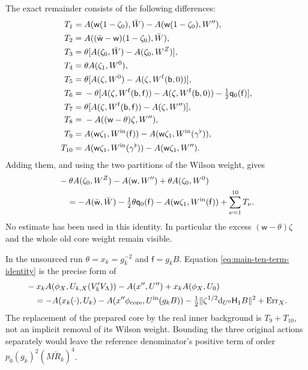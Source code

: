 \documentclass[11pt,letterpaper,reqno]{amsart}
\theoremstyle{definition}
\theoremstyle{remark}
\begin{document}
The exact remainder consists of the following differences:
\begin{align*}
 T_1={}&A(\mathsf w(1-\zeta_0),\bar W)
                       -A(\mathsf w(1-\zeta_0),W''),\\
 T_2={}&A((\bar{\mathsf w}-\mathsf w)(1-\zeta_0),\bar W),\\
 T_3={}&\theta[A(\zeta_0,\bar W)-A(\zeta_0,W^Z)],\\
 T_4={}&\theta A(\zeta_1,W^0),\\
 T_5={}&\theta[A(\zeta,W^0)-A(\zeta,W^{\rm f}(\mathsf b,0))],\\
 T_6={}&-\theta[A(\zeta,W^{\rm f}(\mathsf b,\mathsf f))
        -A(\zeta,W^{\rm f}(\mathsf b,0))
                              -\tfrac12\mathsf q_0(\mathsf f)],\\
 T_7={}&\theta[A(\zeta,W^{\rm f}(\mathsf b,\mathsf f))
                                      -A(\zeta,W'')],\\
 T_8={}&-A((\mathsf w-\theta)\zeta,W''),\\
 T_9={}&A(\mathsf w\zeta_1,W^{\rm in}(\mathsf f))
                      -A(\mathsf w\zeta_1,W^{\rm in}(\gamma^\flat)),\\
 T_{10}={}&A(\mathsf w\zeta_1,W^{\rm in}(\gamma^\flat))
                                      -A(\mathsf w\zeta_1,W'').
\end{align*}
Adding them, and using the two partitions of the Wilson
weight, gives
\begin{equation}\label{eq:main-ten-term-identity}
 \begin{split}
 &-\theta A(\zeta_0,W^Z)-A(\mathsf w,W'')
                                 +\theta A(\zeta_0,W^0)\\
 &\quad=-A(\bar{\mathsf w},\bar W)
       -\tfrac12\theta\mathsf q_0(\mathsf f)
       -A(\mathsf w\zeta_1,W^{\rm in}(\mathsf f))
                                  +\sum_{\nu=1}^{10}T_\nu .
 \end{split}
\end{equation}
No estimate has been used in this identity. In particular the
excess \((\mathsf w-\theta)\zeta\) and the whole old core
weight remain visible.

In the unsourced run \(\theta=x_k=g_k^{-2}\) and
\(\mathsf f=g_kB\). Equation
\eqref{eq:main-ten-term-identity} is the precise form of
\begin{equation}\label{eq:mrg-core-cancellation}
 \begin{split}
 &-x_kA(\phi_X,U_{k,X}(V'_kV_\Lambda))
        -A(x'',U'')+x_kA(\phi_X,U_0)\\
 &\quad=-A(x_k(\cdot),U_k)
        -A(x''\phi_{\mathrm{core}},U^{\rm in}(g_kB))
        -\tfrac12\|\zeta^{1/2}\mathrm d_{U^0}\mathsf H_1B\|^2
        +\mathrm{Err}_X .
 \end{split}
\end{equation}
The replacement of the prepared core by the real inner
background is \(T_9+T_{10}\), not an implicit removal of
its Wilson weight. Bounding the three original actions
separately would leave the reference denominator's positive
term of order \(p_0(g_k)^2(M\check R_k)^4\).
\end{document}
